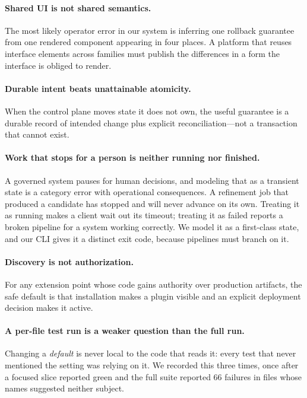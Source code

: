 \documentclass{article}
\begin{document}
\paragraph{Shared UI is not shared semantics.}
The most likely operator error in our system is inferring one rollback guarantee
from one rendered component appearing in four places. A platform that reuses
interface elements across families must publish the differences in a form the
interface is obliged to render.

\paragraph{Durable intent beats unattainable atomicity.}
When the control plane moves state it does not own, the useful guarantee is a
durable record of intended change plus explicit reconciliation---not a transaction
that cannot exist.

\paragraph{Work that stops for a person is neither running nor finished.}
A governed system pauses for human decisions, and modeling that as a transient state
is a category error with operational consequences. A refinement job that produced a
candidate has stopped and will never advance on its own. Treating it as running
makes a client wait out its timeout; treating it as failed reports a broken pipeline
for a system working correctly. We model it as a first-class state, and our CLI
gives it a distinct exit code, because pipelines must branch on it.

\paragraph{Discovery is not authorization.}
For any extension point whose code gains authority over production artifacts, the
safe default is that installation makes a plugin visible and an explicit deployment
decision makes it active.

\paragraph{A per-file test run is a weaker question than the full run.}
Changing a \emph{default} is never local to the code that reads it: every test that
never mentioned the setting was relying on it. We recorded this three times, once
after a focused slice reported green and the full suite reported 66 failures in
files whose names suggested neither subject.
\end{document}

